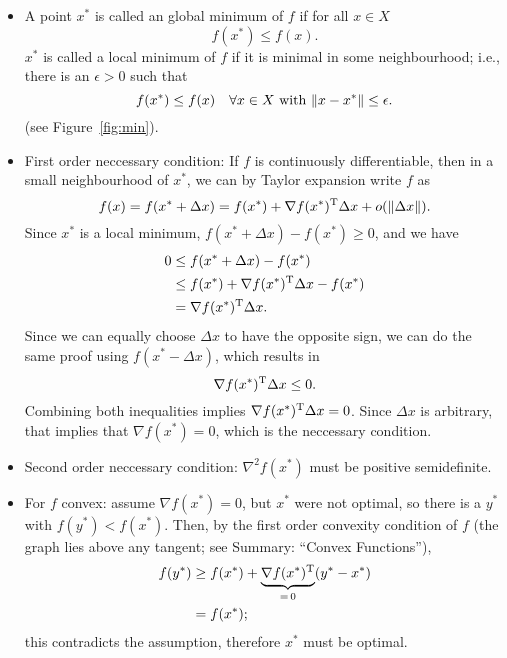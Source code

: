 \documentclass{article}
\begin{document}
\begin{itemize}
\item A point \(x^*\) is called an global minimum of \(f\) if for all \(x \in X\)
  \begin{equation*}
    f(x^*) \leq f(x).
  \end{equation*}
  \(x^*\) is called a local minimum of \(f\) if it is minimal in some neighbourhood; i.e., there is
  an \(\epsilon > 0\) such that
  \begin{equation*}
    f(x^*) \leq f(x) \quad \forall x \in X \text{ with } \enVert{x - x^*} \leq \epsilon.
  \end{equation*}
  (see Figure~\ref{fig:min}).
\item First order neccessary condition: If \(f\) is continuously differentiable, then in a small
  neighbourhood of \(x^*\), we can by Taylor expansion write \(f\) as
  \begin{equation*}
    f(x) = f(x^* + \Delta x) = f(x^*) + \nabla f(x^*)^{\mathrm{T}} \Delta x + o(\lVert \Delta x \rVert).
  \end{equation*}
  Since \(x^*\) is a local minimum, \(f(x^* + \Delta x) - f(x^*) \geq 0\), and we have
  \begin{align*}
    0 &\leq f(x^* + \Delta x) - f(x^*) \\
      &\leq f(x^*) + \nabla f(x^*)^{\mathrm{T}} \Delta x - f(x^*) \\
      &= \nabla f(x^*)^{\mathrm{T}} \Delta x.
  \end{align*}
  Since we can equally choose \(\Delta x\) to have the opposite sign, we can do the same proof using
  \(f(x^* - \Delta x)\), which results in
  \begin{equation*}
    \nabla f(x^*)^{\mathrm{T}} \Delta x \leq 0.
  \end{equation*}
  Combining both inequalities implies \(\nabla f(x^*)^{\mathrm{T}} \Delta x = 0\).  Since \(\Delta x\) is
  arbitrary, that implies that \(\nabla f(x^*) = 0\), which is the neccessary condition.
\item Second order neccessary condition: \(\nabla^2 f(x^*)\) must be positive semidefinite.
\item For \(f\) convex: assume \(\nabla f(x^*) = 0\), but \(x^*\) were not optimal, so there is a
  \(y^*\) with \(f(y^*) < f(x^*)\).  Then, by the first order convexity condition of \(f\) (the
  graph lies above any tangent; see Summary: ``Convex Functions''),
\begin{align*}
  f(y^*) &\geq f(x^*) + \underbrace{\nabla f(x^*)^{\mathrm{T}}}_{=\, 0}(y^* - x^*) \\
         &= f(x^*);
\end{align*}
this contradicts the assumption, therefore \(x^*\) must be optimal.
\end{itemize}
\end{document}
